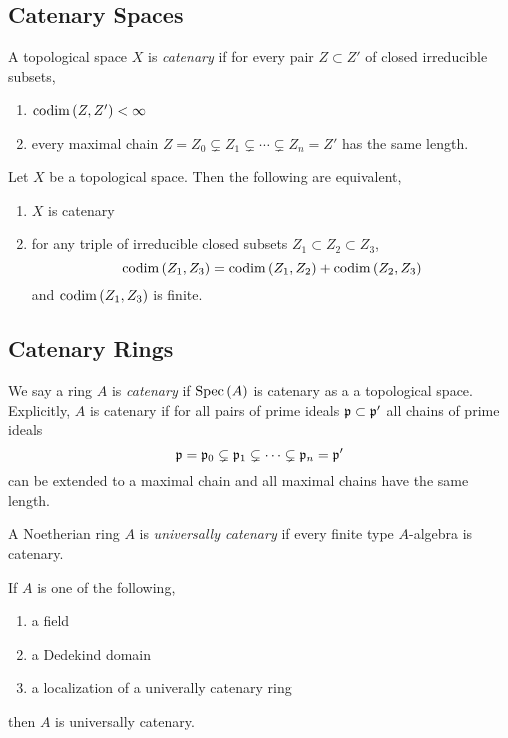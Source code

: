 \documentclass[12pt]{article}
\begin{document}
\subsection{Catenary Spaces}

\begin{defn}
A topological space $X$ is \textit{catenary} if for every pair $Z \subset Z'$ of closed irreducible subsets,
\begin{enumerate}
\item $\mathrm{codim}\left( Z, Z' \right) < \infty$
\item every maximal chain $Z = Z_0 \subsetneq Z_1 \subsetneq \cdots \subsetneq Z_n = Z'$ has the same length.
\end{enumerate}
\end{defn}

\begin{lemma}
Let $X$ be a topological space. Then the following are equivalent,
\begin{enumerate}
\item $X$ is catenary
\item for any triple of irreducible closed subsets $Z_1 \subset Z_2 \subset Z_3$,
\[ \mathrm{codim}\left( Z_1, Z_3 \right) = \mathrm{codim}\left( Z_1, Z_2 \right) + \mathrm{codim}\left( Z_2, Z_3 \right) \]
and $\mathrm{codim}\left( Z_1, Z_3 \right)$ is finite.
\end{enumerate}
\end{lemma}


\subsection{Catenary Rings}

\begin{defn}
We say a ring $A$ is \textit{catenary} if $\mathrm{Spec}\left( A \right)$ is catenary as a a topological space. Explicitly, $A$ is catenary if for all pairs of prime ideals $\mathfrak{p} \subset \mathfrak{p}'$ all chains of prime ideals
\[ \mathfrak{p} = \mathfrak{p}_0 \subsetneq \mathfrak{p}_1 \subsetneq \cdots \subsetneq \mathfrak{p}_n = \mathfrak{p}' \]
can be extended to a maximal chain and all maximal chains have the same length.
\end{defn}

\begin{defn}
A Noetherian ring $A$ is \textit{universally catenary} if every finite type $A$-algebra is catenary.
\end{defn}

\begin{prop}
If $A$ is one of the following,
\begin{enumerate}
\item a field
\item a Dedekind domain
\item a localization of a univerally catenary ring
\end{enumerate}
then $A$ is universally catenary.
\end{prop}
\end{document}
